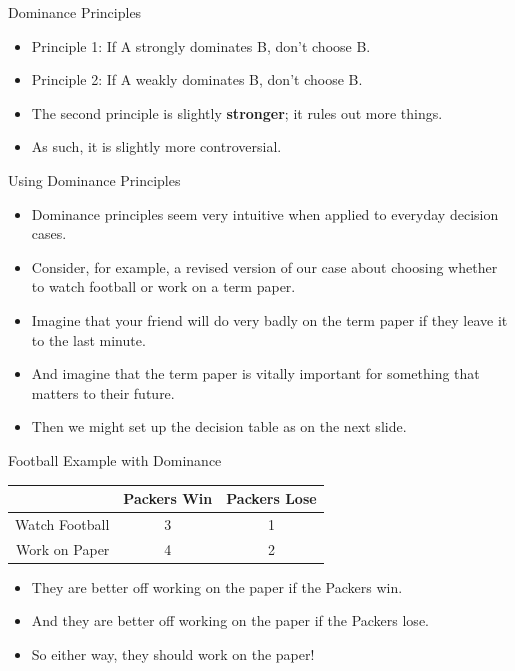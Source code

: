 \documentclass[
  ignorenonframetext,
]{beamer}
\providecommand{\tightlist}{%
  \setlength{\itemsep}{0pt}\setlength{\parskip}{0pt}}
\renewcommand{\,}{\text{, }}
\begin{document}
\begin{frame}{Dominance Principles}
\protect\hypertarget{dominance-principles}{}

\begin{itemize}
\tightlist
\item
  Principle 1: If A strongly dominates B, don't choose B.
\item
  Principle 2: If A weakly dominates B, don't choose B.
\item
  The second principle is slightly \textbf{stronger}; it rules out more
  things.
\item
  As such, it is slightly more controversial.
\end{itemize}

\end{frame}

\begin{frame}{Using Dominance Principles}
\protect\hypertarget{using-dominance-principles}{}

\begin{itemize}
\tightlist
\item
  Dominance principles seem very intuitive when applied to everyday
  decision cases.
\item
  Consider, for example, a revised version of our case about choosing
  whether to watch football or work on a term paper.
\item
  Imagine that your friend will do very badly on the term paper if they
  leave it to the last minute.
\item
  And imagine that the term paper is vitally important for something
  that matters to their future.
\item
  Then we might set up the decision table as on the next slide.
\end{itemize}

\end{frame}

\begin{frame}{Football Example with Dominance}
\protect\hypertarget{football-example-with-dominance}{}

\begin{longtable}[]{@{}rcc@{}}
\toprule
& Packers Win & Packers Lose\tabularnewline
\midrule
\endhead
Watch Football & 3 & 1\tabularnewline
Work on Paper & 4 & 2\tabularnewline
\bottomrule
\end{longtable}

\begin{itemize}
\tightlist
\item
  They are better off working on the paper if the Packers win.
\item
  And they are better off working on the paper if the Packers lose.
\item
  So either way, they should work on the paper!
\end{itemize}

\end{frame}
\end{document}
